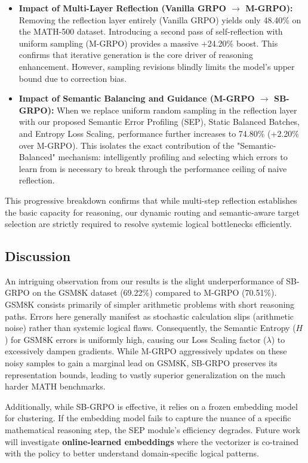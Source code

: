 \begin{itemize}
    \item \textbf{Impact of Multi-Layer Reflection (Vanilla GRPO $\rightarrow$ M-GRPO):} Removing the reflection layer entirely (Vanilla GRPO) yields only 48.40\% on the MATH-500 dataset. Introducing a second pass of self-reflection with uniform sampling (M-GRPO) provides a massive +24.20\% boost. This confirms that iterative generation is the core driver of reasoning enhancement. However, sampling revisions blindly limits the model's upper bound due to correction bias.
    \item \textbf{Impact of Semantic Balancing and Guidance (M-GRPO $\rightarrow$ SB-GRPO):} When we replace uniform random sampling in the reflection layer with our proposed Semantic Error Profiling (SEP), Static Balanced Batches, and Entropy Loss Scaling, performance further increases to 74.80\% (+2.20\% over M-GRPO). This isolates the exact contribution of the "Semantic-Balanced" mechanism: intelligently profiling and selecting which errors to learn from is necessary to break through the performance ceiling of naive reflection.
\end{itemize}
This progressive breakdown confirms that while multi-step reflection establishes the basic capacity for reasoning, our dynamic routing and semantic-aware target selection are strictly required to resolve systemic logical bottlenecks efficiently.

\subsection{Discussion}
An intriguing observation from our results is the slight underperformance of SB-GRPO on the GSM8K dataset (69.22\%) compared to M-GRPO (70.51\%). GSM8K consists primarily of simpler arithmetic problems with short reasoning paths. Errors here generally manifest as stochastic calculation slips (arithmetic noise) rather than systemic logical flaws. Consequently, the Semantic Entropy ($H$) for GSM8K errors is uniformly high, causing our Loss Scaling factor ($\lambda$) to excessively dampen gradients. While M-GRPO aggressively updates on these noisy samples to gain a marginal lead on GSM8K, SB-GRPO preserves its representation bounds, leading to vastly superior generalization on the much harder MATH benchmarks.

Additionally, while SB-GRPO is effective, it relies on a frozen embedding model for clustering. If the embedding model fails to capture the nuance of a specific mathematical reasoning step, the SEP module's efficiency degrades. Future work will investigate \textbf{online-learned embeddings} where the vectorizer is co-trained with the policy to better understand domain-specific logical patterns.